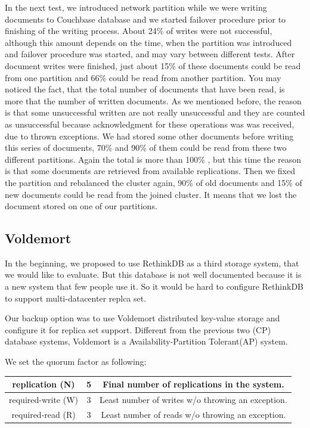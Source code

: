 \documentclass[a4paper]{article}
\begin{document}
In the next test, we introduced network partition while we were writing documents to Couchbase database and we started failover procedure prior to finishing of the writing process. 
About 24\% of writes were not successful, although this amount depends on the time, when the partition was introduced and failover procedure was started, and may vary between different tests.
After document writes were finished, just about 15\% of these documents could be read from one partition and 66\% could be read from another partition.
You may noticed the fact, that the total number of documents that have been read, is more that the number of written documents.
As we mentioned before, the reason is that some unsuccessful written are not really unsuccessful and they are counted as unsuccessful because acknowledgment for these operations was was received, due to thrown exceptions. 
We had stored some other documents before writing this series of documents, 70\% and 90\% of them could be read from these two different partitions.
Again the total is more than 100\% , but this time the reason is that some documents are retrieved from available replications. 
Then we fixed the partition and rebalanced the cluster again, 90\% of old documents and 15\% of new documents could be read from the joined cluster.
It means that we lost the document stored on one of our partitions.

\subsection{Voldemort}

In the beginning, we proposed to use RethinkDB as a third storage system, that we would like to evaluate. But this database is not well documented because it is a new system that few people use it. So it would be hard to configure RethinkDB to support multi-datacenter replca set\cite{rethinkdb}.

Our backup option was to use Voldemort distributed key-value storage and configure it for replica set support. Different from the previous two (CP) database systems, Voldemort is a Availability-Partition Tolerant(AP) system\cite{nathan2010}. 

We set the quorum factor as following:

\begin{table}[hb]
  \centering
  \begin{tabular}{|c|c|c|}
    \hline
    replication (N) & 5 & Final number of replications in the system. \\
    \hline
    required-write (W) & 3 & Least number of writes w/o throwing an exception. \\
    \hline
    required-read (R) & 3 & Least number of reads w/o throwing an exception. \\
    \hline
  \end{tabular}
\end{table}
\end{document}
